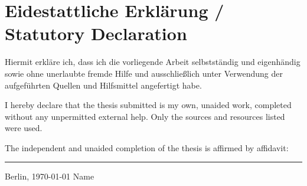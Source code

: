 \chapter*{\LARGE Eidestattliche Erklärung / Statutory Declaration}
Hiermit erkläre ich, dass ich die vorliegende Arbeit selbstständig und eigenhändig sowie ohne unerlaubte fremde Hilfe und ausschließlich unter Verwendung der aufgeführten Quellen und Hilfsmittel angefertigt habe.
\vspace{2em}

\noindent I hereby declare that the thesis submitted is my own, unaided work, completed without any unpermitted external help. Only the sources and resources listed were used.

The independent and unaided completion of the thesis is affirmed by affidavit:

\vspace{30 mm}
\begin{flushright}

\rule{90mm}{1pt}

Berlin, \today \hspace{15 mm} Name 
\end{flushright}
